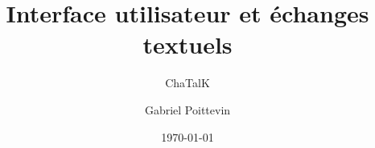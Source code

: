 \documentclass{beamer}
\title[Présentation]{Interface utilisateur et échanges textuels}
\subtitle[\ldots]{ChaTalK}
\author[Poittevin]{Gabriel Poittevin}
\institute[ALGGOT™]{ALGGOT™}
\date{\today}
\begin{document}
	\maketitle

	\begin{frame}
	\end{frame}
\end{document}
